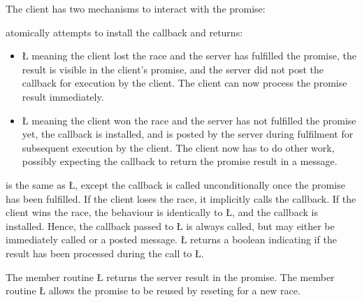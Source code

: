\documentclass[openright,twoside]{report}
\begin{document}
The client has two mechanisms to interact with the promise:
\begin{description}[leftmargin=3pt,topsep=5pt,parsep=0pt]
\item[\LGinlinetrue\LGbegin\lgrinde\L{\LB{\V{maybe}}}\endlgrinde\LGend{}] 
atomically attempts to install the callback and returns:
\begin{itemize}
\item
\LGinlinetrue\LGbegin\lgrinde\L{}\endlgrinde\LGend{} meaning the client lost the race and the server has fulfilled the promise, the result is visible in the client's promise, and the server did not post the callback for execution by the client.
The client can now process the promise result immediately.
\item
\LGinlinetrue\LGbegin\lgrinde\L{}\endlgrinde\LGend{} meaning the client won the race and the server has not fulfilled the promise yet, the callback is installed, and is posted by the server during fulfilment for subsequent execution by the client.
The client now has to do other work, possibly expecting the callback to return the promise result in a message.
\end{itemize}
\item[\LGinlinetrue\LGbegin\lgrinde\L{\LB{\V{then}}}\endlgrinde\LGend{}]
is the same as \LGinlinetrue\LGbegin\lgrinde\L{}\endlgrinde\LGend{}, except the callback is called unconditionally once the promise has been fulfilled.
If the client loses the race, it implicitly calls the callback.
If the client wins the race, the behaviour is identically to \LGinlinetrue\LGbegin\lgrinde\L{}\endlgrinde\LGend{}, and the callback is installed.
Hence, the callback passed to \LGinlinetrue\LGbegin\lgrinde\L{}\endlgrinde\LGend{} is always called, but may either be immediately called or a posted message.
\LGinlinetrue\LGbegin\lgrinde\L{}\endlgrinde\LGend{} returns a boolean indicating if the result has been processed during the call to \LGinlinetrue\LGbegin\lgrinde\L{}\endlgrinde\LGend{}.
\end{description}
The member routine \LGinlinetrue\LGbegin\lgrinde\L{}\endlgrinde\LGend{} returns the server result in the promise.
The member routine \LGinlinetrue\LGbegin\lgrinde\L{}\endlgrinde\LGend{} allows the promise to be reused by reseting for a new race.
\end{document}
